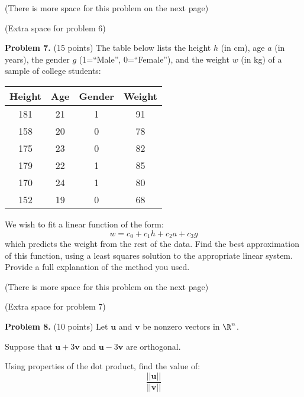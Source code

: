 \documentclass[12pt]{article}
\begin{document}
\vfill

(There is more space for this problem on the next page)

\clearpage

(Extra space for problem 6)

\clearpage

\textbf{Problem 7.} (15 points) The table below lists the height $h$ (in cm), age $a$ (in years), the gender $g$ (1=``Male'', 0=``Female''), and the weight $w$ (in kg) of a sample of college students:

\begin{center}
\begin{tabular}{c|c|c|c}
Height & Age & Gender & Weight\\\hline
181 & 21 & 1 & 91\\
158 & 20 & 0 & 78\\
175 & 23 & 0 & 82\\
179 & 22 & 1 & 85\\
170 & 24 & 1 & 80\\
152 & 19 & 0 & 68\\
\end{tabular}
\end{center}

We wish to fit a linear function of the form:
\[
w=c_0+c_1h+c_2a+c_3g
\]
which predicts the weight from the rest of the data. Find the best approximation of this function, using a least squares solution to the appropriate linear system. Provide a full explanation of the method you used.

\vfill

(There is more space for this problem on the next page)

\clearpage

(Extra space for problem 7)

\clearpage

\textbf{Problem 8.} (10 points) Let $\mathbf{u}$ and $\mathbf{v}$ be nonzero vectors in $\R^n$.

Suppose that $\mathbf{u}+3\mathbf{v}$ and $\mathbf{u}-3\mathbf{v}$ are orthogonal.

Using properties of the dot product, find the value of:
\[
\frac{||\mathbf{u}||}{||\mathbf{v}||}
\]
\end{document}
